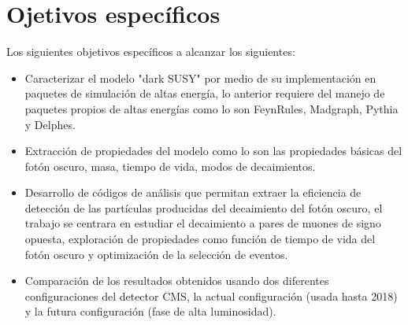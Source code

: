 \chapter{Ojetivos específicos}

Los siguientes objetivos específicos a alcanzar los siguientes:
\begin{itemize}
\item Caracterizar el modelo "dark SUSY" por medio de su implementación en paquetes de simulación de altas energía, lo anterior requiere del manejo de paquetes propios de altas energías como lo son FeynRules, Madgraph, Pythia y Delphes.
\item Extracción de propiedades del modelo como lo son las propiedades básicas del fotón oscuro, masa, tiempo de vida, modos de decaimientos. %
\item Desarrollo de códigos de análisis que permitan extraer la eficiencia de detección de las partículas producidas del decaimiento del fotón oscuro, el trabajo se centrara en estudiar el decaimiento a pares de muones de signo opuesta, exploración de propiedades como función de tiempo de vida del fotón oscuro y optimización de la selección de eventos.
\item Comparación de los resultados obtenidos usando dos diferentes configuraciones del detector CMS, la actual configuración (usada hasta 2018) y la futura configuración (fase de alta luminosidad).%


\end{itemize}
